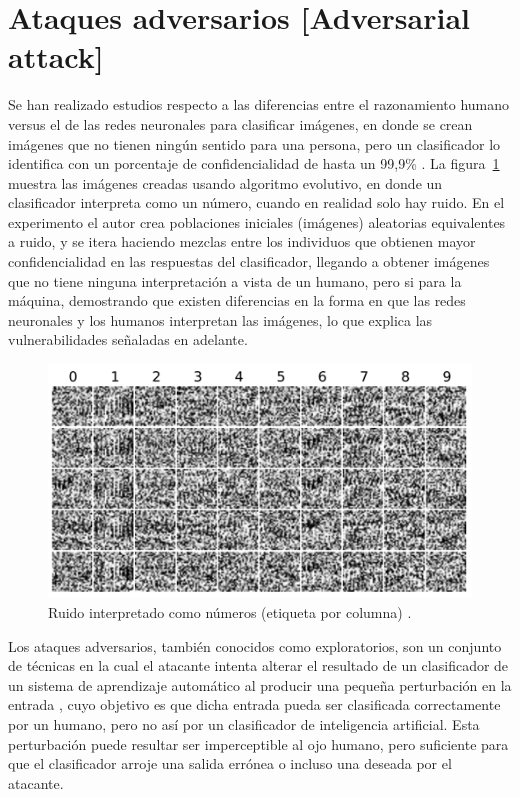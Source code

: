 \section{Ataques adversarios [Adversarial attack]}

Se han realizado estudios respecto a las diferencias entre el razonamiento humano versus el de las redes neuronales para clasificar imágenes, en donde se crean imágenes que no tienen ningún sentido para una persona, pero un clasificador lo identifica con un porcentaje de confidencialidad de hasta un 99,9\% \parencite{r10}. La figura~\ref{fig:16} muestra las imágenes creadas usando algoritmo evolutivo, en donde un clasificador interpreta como un número, cuando en realidad solo hay ruido. En el experimento el autor crea poblaciones iniciales (imágenes) aleatorias equivalentes a ruido, y se itera haciendo mezclas entre los individuos que obtienen mayor confidencialidad en las respuestas del clasificador, llegando a obtener imágenes que no tiene ninguna interpretación a vista de un humano, pero si para la máquina, demostrando que existen diferencias en la forma en que las redes neuronales y los humanos interpretan las imágenes, lo que explica las vulnerabilidades señaladas en adelante.

\begin{figure}[th]
\centering
\includegraphics [scale = 0.95] {Figures/figura_16.PNG}
\decoRule
\caption[Ruido interpretado]{Ruido interpretado como números (etiqueta por columna) \parencite{r10}.}
\label{fig:16}
\end{figure}

Los ataques adversarios, también conocidos como exploratorios, son un conjunto de técnicas en la cual el atacante intenta alterar el resultado de un clasificador de un sistema de aprendizaje automático al producir una pequeña perturbación en la entrada \parencite{r4}, cuyo objetivo es que dicha entrada pueda ser clasificada correctamente por un humano, pero no así por un clasificador de inteligencia artificial. Esta perturbación puede resultar ser imperceptible al ojo humano, pero suficiente para que el clasificador arroje una salida errónea o incluso una deseada por el atacante. 


